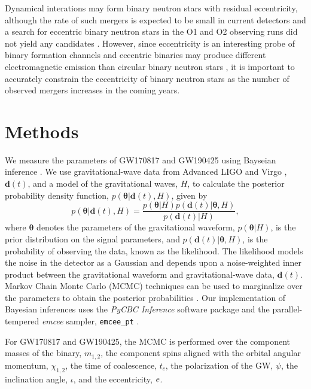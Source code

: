 Dynamical interations may form binary neutron stars with residual eccentricity, although the rate of such mergers is expected to be small in current detectors \cite{Lee:2009ca,Ye:2019xvf} and a search for eccentric binary neutron stars in the O1 and O2 observing runs did not yield any candidates \cite{Nitz:2019spj}. However, since eccentricity is an interesting probe of binary formation channels and eccentric binaries may produce different electromagnetic emission than circular binary neutron stars \cite{Radice:2016dwd,Chaurasia:2018zhg}, it is important to accurately constrain the eccentricity of binary neutron stars as the number of observed mergers increases in the coming years.

\section{Methods}

\label{sec:pe-method}

We measure the parameters of GW170817 and GW190425 using Bayseian inference \cite{Finn:2000hj,Rover:2006ni}. We use gravitational-wave data from Advanced LIGO and Virgo \cite{Blackburn:170817,dataLIGO:190425}, $\boldsymbol{d}(t)$, and a model of the gravitational waves, $H$, to calculate the posterior probability density function, $p(\boldsymbol{\theta}|\boldsymbol{d}(t),H)$, given by
\begin{equation}
    p(\boldsymbol{\theta}|\boldsymbol{d}(t),H) = \frac{p(\boldsymbol{\theta}|H) p(\boldsymbol{d}(t)|\boldsymbol{\theta},H)}{p(\boldsymbol{d}(t)|H)},
\end{equation}
where $\boldsymbol{\theta}$ denotes the parameters of the gravitational waveform, $p(\boldsymbol{\theta}|H)$, is the prior distribution on the signal parameters, and $p(\boldsymbol{d}(t)|\boldsymbol{\theta},H)$, is the probability of observing the data, known as the likelihood. The likelihood models the noise in the detector as a Gaussian and depends upon a noise-weighted inner product between the gravitational waveform and gravitational-wave data, $\boldsymbol{d}(t)$. Markov Chain Monte Carlo (MCMC) techniques can be used to marginalize over the parameters to obtain the posterior probabilities \cite{Christensen:2001cr}. Our implementation of Bayesian inferences uses the \textit{PyCBC Inference} software package \cite{Biwer:2018osg,alex_nitz_2020_3630601} and the parallel-tempered \textit{emcee} sampler, \texttt{emcee\_pt} \cite{ForemanMackey:2012ig,emceept}.

For GW170817 and GW190425, the MCMC is performed over the component masses of the binary, $m_{1,2}$, the component spins aligned with the orbital angular momentum, $\chi_{1,2}$, the time of coalescence, $t_c$, the polarization of the GW, $\psi$, the inclination angle, $\iota$, and the eccentricity, $e$.

